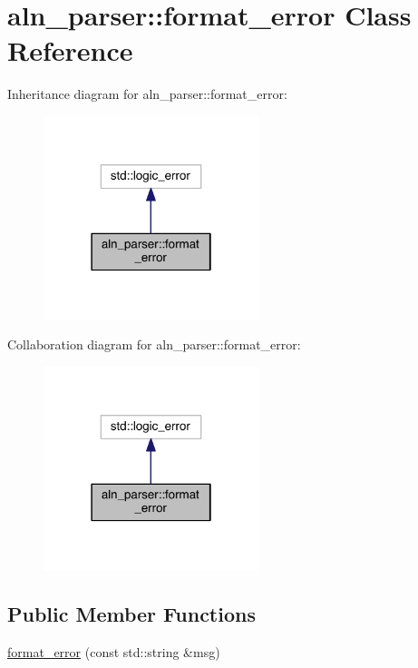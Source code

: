 \hypertarget{classaln__parser_1_1format__error}{\section{aln\+\_\+parser\+:\+:format\+\_\+error Class Reference}
\label{classaln__parser_1_1format__error}
}


Inheritance diagram for aln\+\_\+parser\+:\+:format\+\_\+error\+:
\nopagebreak
\begin{figure}[H]
\begin{center}
\leavevmode
\includegraphics[width=178pt]{classaln__parser_1_1format__error__inherit__graph}
\end{center}
\end{figure}


Collaboration diagram for aln\+\_\+parser\+:\+:format\+\_\+error\+:
\nopagebreak
\begin{figure}[H]
\begin{center}
\leavevmode
\includegraphics[width=178pt]{classaln__parser_1_1format__error__coll__graph}
\end{center}
\end{figure}
\subsection*{Public Member Functions}
\begin{DoxyCompactItemize}
\item 
\hyperlink{classaln__parser_1_1format__error_ad1eecaae5fc93f95695db13fe25d8914}{format\+\_\+error} (const std\+::string \&msg)
\end{DoxyCompactItemize}


